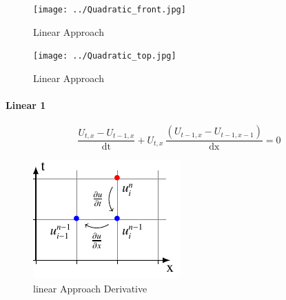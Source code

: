 \documentclass[12pt]{article}
\begin{document}
       \begin{figure}[!ht]
           \begin{minipage}[b]{0.5\textwidth}
             \texttt{[image: ../Quadratic\_front.jpg]}
             \caption{Linear Approach}
             \label{fig:STDL}
           \end{minipage}
           \begin{minipage}[b]{0.5\textwidth}
             \texttt{[image: ../Quadratic\_top.jpg]}
             \caption{Linear Approach}
             \label{fig:STDL}
           \end{minipage}
       \end{figure}

        \newpage
	\paragraph{Linear 1}

        \begin{equation}
            \frac{U_{t,x}-U_{t-1,x}}{\mathrm{dt}}+ U_{t,x}\, \frac{\left(U_{t-1,x}-U_{t-1,x-1}\right)}{\mathrm{dx}}=0
        \end{equation}

        \begin{figure}[!ht]
          \centering
          \includegraphics[width=.8\textwidth]{../tikz/linear1/linear1.pdf}
          \caption{linear Approach Derivative}
          \label{fig:STDL}
        \end{figure}
\end{document}
